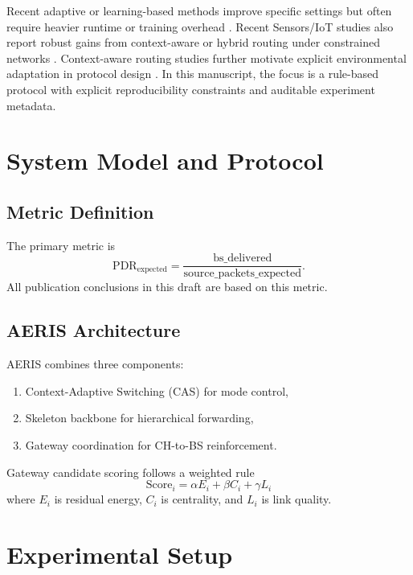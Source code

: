 ﻿\documentclass[sensors,article,submit,moreauthors,pdftex]{Definitions/mdpi}
\begin{document}
Recent adaptive or learning-based methods improve specific settings but often require heavier runtime or training overhead \cite{Ren2024,Okine2024,Chen2023Survey}. Recent Sensors/IoT studies also report robust gains from context-aware or hybrid routing under constrained networks \cite{ElFouly2023ILP,Dan2024EMRAR,Bhukya2025Hybrid}. Context-aware routing studies further motivate explicit environmental adaptation in protocol design \cite{Liu2018Environment,Zhao2019Context}. In this manuscript, the focus is a rule-based protocol with explicit reproducibility constraints and auditable experiment metadata.

\section{System Model and Protocol}
\subsection{Metric Definition}
The primary metric is
\begin{equation}
\mathrm{PDR}_{\mathrm{expected}} = \frac{\mathrm{bs\_delivered}}{\mathrm{source\_packets\_expected}}.
\end{equation}
All publication conclusions in this draft are based on this metric.

\subsection{AERIS Architecture}
AERIS combines three components:
\begin{enumerate}
\item Context-Adaptive Switching (CAS) for mode control,
\item Skeleton backbone for hierarchical forwarding,
\item Gateway coordination for CH-to-BS reinforcement.
\end{enumerate}
Gateway candidate scoring follows a weighted rule
\begin{equation}
\mathrm{Score}_i = \alpha E_i + \beta C_i + \gamma L_i
\end{equation}
where $E_i$ is residual energy, $C_i$ is centrality, and $L_i$ is link quality.

\section{Experimental Setup}
\end{document}
